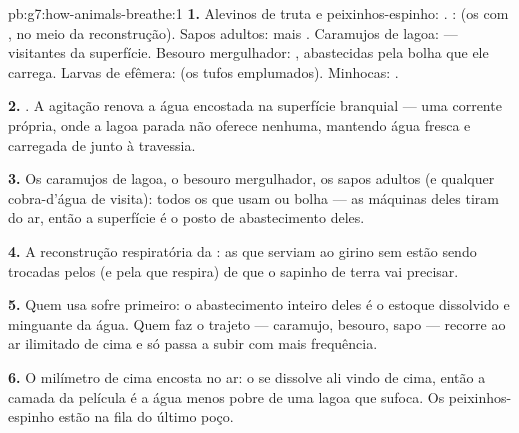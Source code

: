 \begin{solution}{pb:g7:how-animals-breathe:1}
\textbf{1.} Alevinos de truta e peixinhos-espinho: . :
 (os com , no meio da reconstrução). Sapos adultos:
 mais . Caramujos de lagoa:  --- visitantes da
superfície. Besouro mergulhador: , abastecidas pela bolha que
ele carrega. Larvas de efêmera:  (os tufos emplumados).
Minhocas: .

\textbf{2.} . A agitação renova a água encostada na
superfície branquial --- uma corrente própria, onde a lagoa parada não
oferece nenhuma, mantendo água fresca e carregada de  junto à
travessia.

\textbf{3.} Os caramujos de lagoa, o besouro mergulhador, os sapos
adultos (e qualquer cobra-d'água de visita): todos os que usam 
ou bolha --- as máquinas deles tiram  do ar, então a superfície
é o posto de abastecimento deles.

\textbf{4.} A reconstrução respiratória da : as 
que serviam ao girino sem  estão sendo trocadas pelos  (e
pela  que respira) de que o sapinho de terra vai precisar.

\textbf{5.} Quem usa  sofre primeiro: o abastecimento inteiro
deles é o estoque dissolvido e minguante da água. Quem faz o trajeto
--- caramujo, besouro, sapo --- recorre ao ar ilimitado de cima e só
passa a subir com mais frequência.

\textbf{6.} O milímetro de cima encosta no ar: o  se dissolve
ali vindo de cima, então a camada da película é a água menos pobre de
uma lagoa que sufoca. Os peixinhos-espinho estão na fila do último
poço.


\end{solution}
